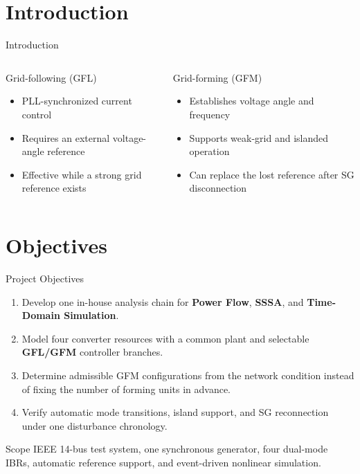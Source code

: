 \documentclass{beamer}
\begin{document}
\section{Introduction}
\begin{frame}{Introduction}
\begin{columns}[c,onlytextwidth]
\small
\begin{block}{Grid-following (GFL)}
\begin{minipage}[t][3.05cm][t]{\linewidth}
\begin{itemize}
  \item PLL-synchronized current control
  \item Requires an external voltage-angle reference
  \item Effective while a strong grid reference exists
\end{itemize}
\end{minipage}
\end{block}
\small
\begin{block}{Grid-forming (GFM)}
\begin{minipage}[t][3.05cm][t]{\linewidth}
\begin{itemize}
  \item Establishes voltage angle and frequency
  \item Supports weak-grid and islanded operation
  \item Can replace the lost reference after SG disconnection
\end{itemize}
\end{minipage}
\end{block}
\end{columns}
\end{frame}

\section{Objectives}
\begin{frame}{Project Objectives}
\small
\begin{enumerate}
  \item Develop one in-house analysis chain for \textbf{Power Flow}, \textbf{SSSA}, and \textbf{Time-Domain Simulation}.
  \item Model four converter resources with a common plant and selectable \textbf{GFL/GFM} controller branches.
  \item Determine admissible GFM configurations from the network condition instead of fixing the number of forming units in advance.
  \item Verify automatic mode transitions, island support, and SG reconnection under one disturbance chronology.
\end{enumerate}
\vspace{0.35cm}
\begin{block}{Scope}
IEEE 14-bus test system, one synchronous generator, four dual-mode IBRs, automatic reference support, and event-driven nonlinear simulation.
\end{block}
\end{frame}
\end{document}
